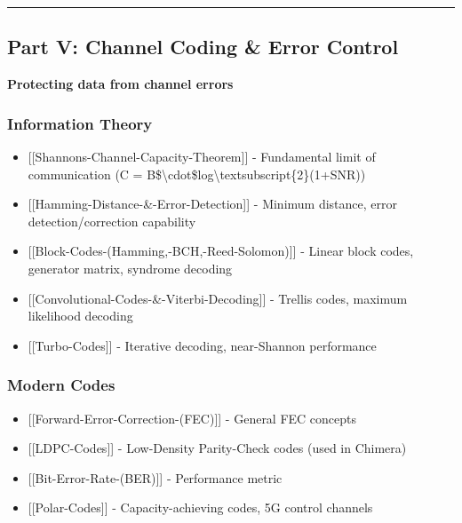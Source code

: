 \begin{center}\rule{0.5\linewidth}{0.5pt}\end{center}

\subsection{\texorpdfstring{ Part V: Channel Coding \& Error
Control}{ Part V: Channel Coding \& Error Control}}\label{part-v-channel-coding-error-control}

\textbf{Protecting data from channel errors}

\subsubsection{Information Theory}\label{information-theory}

\begin{itemize}
\tightlist
\item
  {[}{[}Shannon\textquotesingle s-Channel-Capacity-Theorem{]}{]} -
  Fundamental limit of communication (C =
  B\$\textbackslash cdot\$log\textbackslash textsubscript\{2\}(1+SNR))
\item
  {[}{[}Hamming-Distance-\&-Error-Detection{]}{]} - Minimum distance,
  error detection/correction capability
\item
  {[}{[}Block-Codes-(Hamming,-BCH,-Reed-Solomon){]}{]} - Linear block
  codes, generator matrix, syndrome decoding
\item
  {[}{[}Convolutional-Codes-\&-Viterbi-Decoding{]}{]} - Trellis codes,
  maximum likelihood decoding
\item
  {[}{[}Turbo-Codes{]}{]} - Iterative decoding, near-Shannon performance
\end{itemize}

\subsubsection{Modern Codes}\label{modern-codes}

\begin{itemize}
\tightlist
\item
  {[}{[}Forward-Error-Correction-(FEC){]}{]} - General FEC concepts
\item
  {[}{[}LDPC-Codes{]}{]} - Low-Density Parity-Check codes (used in
  Chimera)
\item
  {[}{[}Bit-Error-Rate-(BER){]}{]} - Performance metric
\item
  {[}{[}Polar-Codes{]}{]} - Capacity-achieving codes, 5G control
  channels
\end{itemize}

